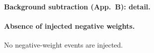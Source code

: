 \paragraph{Background subtraction (App.~B): detail.}

\paragraph{Absence of injected negative weights.} No negative-weight events are injected.

